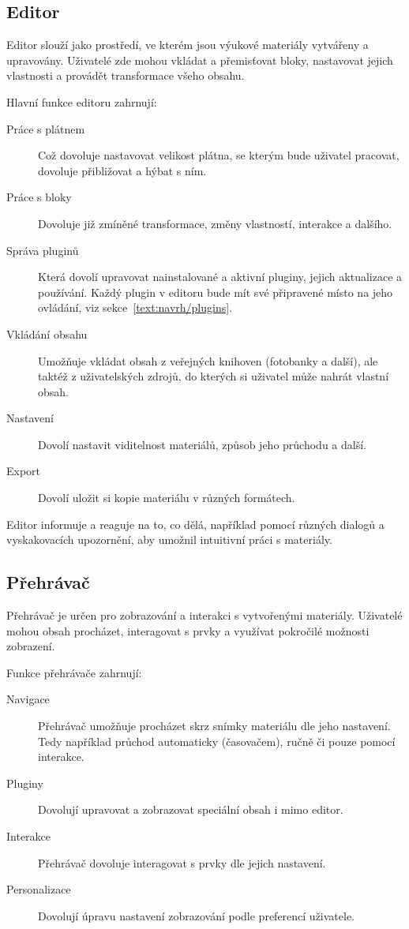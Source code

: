 \subsection{Editor}

Editor slouží jako prostředí, ve kterém jsou výukové materiály vytvářeny a upravovány. 
Uživatelé zde mohou vkládat a přemisťovat bloky, nastavovat jejich vlastnosti a provádět transformace všeho obsahu.

Hlavní funkce editoru zahrnují:
\begin{description}
    \item[Práce s plátnem] Což dovoluje nastavovat velikost plátna, se kterým bude uživatel pracovat, dovoluje přibližovat a hýbat s ním.
    \item[Práce s bloky] Dovoluje již zmíněné transformace, změny vlastností, interakce a dalšího.
    \item[Správa pluginů] Která dovolí upravovat nainstalované a aktivní pluginy, jejich aktualizace a používání. Každý plugin v editoru bude mít své připravené místo na jeho ovládání, viz sekce~\ref{text:navrh/plugins}.
    \item[Vkládání obsahu] Umožňuje vkládat obsah z veřejných knihoven (fotobanky a další), ale taktéž z uživatelských zdrojů, do kterých si uživatel může nahrát vlastní obsah.
    \item[Nastavení] Dovolí nastavit viditelnost materiálů, způsob jeho průchodu a další.
    \item[Export] Dovolí uložit si kopie materiálu v různých formátech.
\end{description}

Editor informuje a reaguje na to, co dělá, například pomocí různých dialogů a vyskakovacích upozornění, aby umožnil intuitivní práci s materiály.

\subsection{Přehrávač}

Přehrávač je určen pro zobrazování a interakci s vytvořenými materiály. 
Uživatelé mohou obsah procházet, interagovat s prvky a využívat pokročilé možnosti zobrazení.

Funkce přehrávače zahrnují:

\begin{description}
    \item[Navigace] Přehrávač umožňuje procházet skrz snímky materiálu dle jeho nastavení. Tedy například průchod automaticky (časovačem), ručně či pouze pomocí interakce.
    \item[Pluginy] Dovolují upravovat a zobrazovat speciální obsah i mimo editor.
    \item[Interakce] Přehrávač dovoluje interagovat s prvky dle jejich nastavení.
    \item[Personalizace] Dovolují úpravu nastavení zobrazování podle preferencí uživatele.
\end{description}


